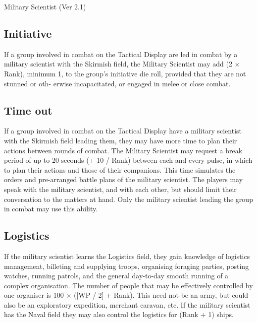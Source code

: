 \begin{Chapter}{Military Scientist (Ver 2.1)}
\subsection{Initiative}

If a group involved in combat on the Tactical Display are led in
combat by a military scientist with the Skirmish field, the Military
Scientist may add (2 × Rank), minimum 1, to the group’s initiative die
roll, provided that they are not stunned or oth- erwise incapacitated,
or engaged in melee or close combat.

\subsection{Time out}

If a group involved in combat on the Tactical Display have a military
scientist with the Skirmish field leading them, they may have more
time to plan their actions between rounds of combat.  The Military
Scientist may request a break period of up to 20 seconds (+ 10 / Rank)
between each and every pulse, in which to plan their actions and those
of their companions. This time simulates the orders and pre-arranged
battle plans of the military scientist.  The players may speak with
the military scientist, and with each other, but should limit their
conversation to the matters at hand. Only the military scientist
leading the group in combat may use this ability.

\subsection{Logistics}

If the military scientist learns the Logistics field, they gain
knowledge of logistics management, billeting and supplying troops,
organising foraging parties, posting watches, running patrols, and the
general day-to-day smooth running of a complex organisation.  The
number of people that may be effectively controlled by one organiser
is 100 × ([WP / 2] + Rank).  This need not be an army, but could also
be an exploratory expedition, merchant caravan, etc. If the military
scientist has the Naval field they may also control the logistics for
(Rank + 1) ships.

\end{Chapter}
